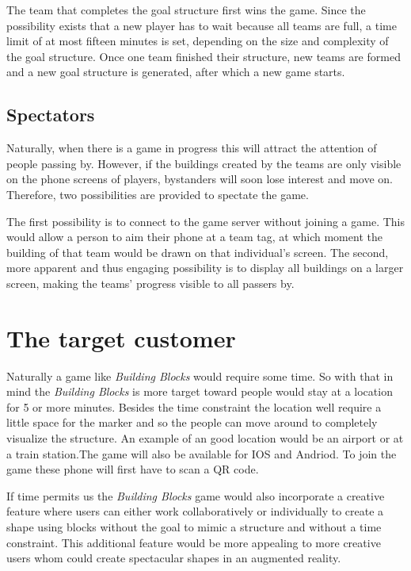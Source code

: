 \documentclass[a4paper,titlepage]{scrartcl}
\begin{document}
The team that completes the goal structure first wins the game. Since the possibility exists that a new player has to wait because all teams are full, a time limit of at most fifteen minutes is set, depending on the size and complexity of the goal structure. Once one team finished their structure, new teams are formed and a new goal structure is generated, after which a new game starts.

\subsection{Spectators}
\label{subsec:spectators}
Naturally, when there is a game in progress this will attract the attention of people passing by. However, if the buildings created by the teams are only visible on the phone screens of players, bystanders will soon lose interest and move on. Therefore, two possibilities are provided to spectate the game.

The first possibility is to connect to the game server without joining a game. This would allow a person to aim their phone at a team tag, at which moment the building of that team would be drawn on that individual's screen. The second, more apparent and thus engaging possibility is to display all buildings on a larger screen, making the teams' progress visible to all passers by.




\section{The target customer}
Naturally a game like \textit{Building Blocks} would require some time. So with that in mind the \textit{Building Blocks} is more target toward people would stay at a location for 5 or more minutes. Besides the time constraint the location well require a little space for the marker and so the people can move around to completely visualize the structure. An example of an good location would be an airport or at a train station.The game will also be  available for IOS and Andriod. To join the game these phone will first have to scan a QR code.

If time permits us the \textit{Building Blocks} game would also incorporate a creative feature where users can either work collaboratively or individually to create a shape using blocks without the goal to mimic a structure and without a time constraint. This additional feature would be more appealing to more creative users whom could create spectacular shapes in an augmented reality. 
\end{document}
